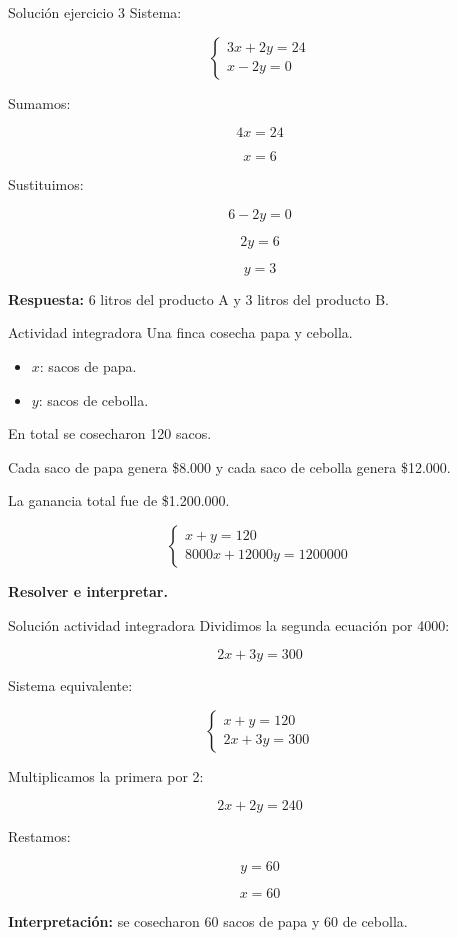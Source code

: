 \documentclass{beamer}
\begin{document}
	\begin{frame}{Solución ejercicio 3}
		Sistema:
		
		\[
		\begin{cases}
			3x + 2y = 24 \\
			x - 2y = 0
		\end{cases}
		\]
		
		Sumamos:
		
		\[
		4x=24
		\]
		
		\[
		x=6
		\]
		
		Sustituimos:
		
		\[
		6-2y=0
		\]
		
		\[
		2y=6
		\]
		
		\[
		y=3
		\]
		
		\bigskip
		
		\textbf{Respuesta:} 6 litros del producto A y 3 litros del producto B.
	\end{frame}
	
	\begin{frame}{Actividad integradora}
		Una finca cosecha papa y cebolla.
		
		\begin{itemize}
			\item $x$: sacos de papa.
			\item $y$: sacos de cebolla.
		\end{itemize}
		
		En total se cosecharon 120 sacos.
		
		Cada saco de papa genera \$8.000 y cada saco de cebolla genera \$12.000.
		
		La ganancia total fue de \$1.200.000.
		
		\[
		\begin{cases}
			x+y=120 \\
			8000x+12000y=1200000
		\end{cases}
		\]
		
		\bigskip
		
		\textbf{Resolver e interpretar.}
	\end{frame}
	
	\begin{frame}{Solución actividad integradora}
		Dividimos la segunda ecuación por 4000:
		
		\[
		2x+3y=300
		\]
		
		Sistema equivalente:
		
		\[
		\begin{cases}
			x+y=120 \\
			2x+3y=300
		\end{cases}
		\]
		
		Multiplicamos la primera por 2:
		
		\[
		2x+2y=240
		\]
		
		Restamos:
		
		\[
		y=60
		\]
		
		\[
		x=60
		\]
		
		\bigskip
		
		\textbf{Interpretación:} se cosecharon 60 sacos de papa y 60 de cebolla.
	\end{frame}
	
\end{document}
